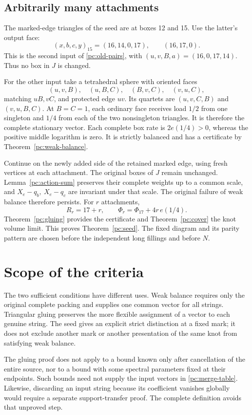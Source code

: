 \documentclass[11pt]{article}
\numberwithin{equation}{section}
\theoremstyle{definition}\newtheorem{definition}[theorem]{Definition}
\theoremstyle{remark}\newtheorem{remark}[theorem]{Remark}
\begin{document}
\subsection{Arbitrarily many attachments}
The marked-edge triangles of the seed are at boxes 12 and 15.
Use the latter's output face:
\[
              (x,b,c,y)_{15}=(16,14,0,17),\qquad (16,17,0).
\]
This is the second input of \eqref{pc:old-pairs}, with
\((u,v,B,a)=(16,0,17,14)\). Thus no box in \(J\) is changed.

For the other input take a tetrahedral sphere with oriented faces
\[
 (u,v,B),\quad(u,B,C),\quad(B,v,C),\quad(v,u,C),
\]
matching \(uB,vC\), and protected edge \(uv\).
Its quartets are \((u,v,C,B)\) and \((v,u,B,C)\).
At \(B=C=1\), each ordinary face receives load \(1/2\) from
one singleton and \(1/4\) from each of the two nonsingleton
triangles. It is therefore the complete stationary vector.
Each complete box rate is \(2e(1/4)>0\), whereas the positive
middle logarithm is zero. It is strictly balanced and has a
certificate by Theorem~\ref{pc:weak-balance}.

Continue on the newly added side of the retained marked edge,
using fresh vertices at each attachment. The original boxes of
\(J\) remain unchanged. Lemma~\ref{pc:action-sum} preserves their
complete weights up to a common scale, and
\(X_e-q_b,\ X_e-q_c\) are invariant under that scale. The original
failure of weak balance therefore persists. For \(r\) attachments,
\[
                 R_r=17+r,\qquad
                 \Phi_r=\Phi_{17}+4r\,e(1/4).
\]
Theorem~\ref{pc:gluing} provides the certificate and
Theorem~\ref{pc:cover} the knot volume limit. This proves
Theorem~\ref{pc:seed}. The fixed diagram and its parity pattern
are chosen before the independent long fillings and before \(N\).

\section{Scope of the criteria}

The two sufficient conditions have different uses. Weak balance
requires only the original complete packing and supplies one
common vector for all strings. Triangular gluing preserves the
more flexible assignment of a vector to each genuine string.
The seed gives an explicit strict distinction at a fixed mark;
it does not exclude another mark or another presentation of the
same knot from satisfying weak balance.

The gluing proof does not apply to a bound known only after
cancellation of the entire source, nor to a bound with some
spectral parameters fixed at their endpoints. Such bounds need
not supply the input vectors in \eqref{pc:merge-table}. Likewise,
discarding an input string because its coefficient vanishes
globally would require a separate support-transfer proof.
The complete definition avoids that unproved step.
\end{document}
